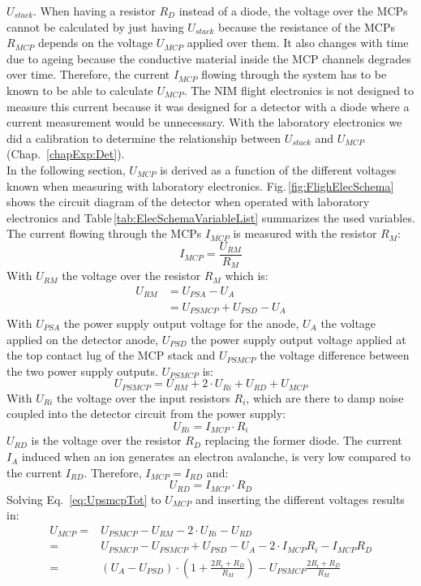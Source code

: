 $U_{stack}$. When having a resistor $R_D$ instead of a diode, the voltage over the MCPs cannot be calculated by just having $U_{stack}$ because the resistance of the MCPs $R_{MCP}$ depends on the voltage $U_{MCP}$ applied over them. It also changes with time due to ageing because the conductive material inside the MCP channels degrades over time. Therefore, the current $I_{MCP}$ flowing through the system has to be known to be able to calculate $U_{MCP}$. The NIM flight electronics is not designed to measure this current because it was designed for a detector with a diode where a current measurement would be unnecessary. With the laboratory electronics we did a calibration to determine the relationship between $U_{stack}$ and $U_{MCP}$ (Chap.~\ref{chapExp:Det}).\\
		In the following section, $U_{MCP}$ is derived as a function of the different voltages known when measuring with laboratory electronics. Fig.\,\ref{fig:FlighElecSchema} shows the circuit diagram of the detector when operated with laboratory electronics and Table\,\ref{tab:ElecSchemaVariableList} summarizes the used variables. The current flowing through the MCPs $I_{MCP}$ is measured with the resistor $R_M$:
		\begin{equation}
			I_{MCP} = \frac{U_{RM}}{R_{M}}
		\end{equation}
		With $U_{RM}$ the voltage over the resistor $R_{M}$ which is:
		\begin{align}
			U_{RM} &= U_{PSA} - U_{A}\\
				   &= U_{PSMCP} + U_{PSD} - U_A
		\end{align}
		With $U_{PSA}$ the power supply output voltage for the anode, $U_{A}$ the voltage applied on the detector anode, $U_{PSD}$ the power supply output voltage applied at the top contact lug of the MCP stack and $U_{PSMCP}$ the voltage difference between the two power supply outputs. $U_{PSMCP}$ is:
		\begin{equation}
			U_{PSMCP} = U_{RM} + 2\cdot U_{Ri} + U_{RD} + U_{MCP}
			\label{eq:UpsmcpTot}
		\end{equation}
		With $U_{Ri}$ the voltage over the input resistors $R_i$, which are there to damp noise coupled into the detector circuit from the power supply:
		\begin{equation}
			U_{Ri} = I_{MCP}\cdot R_i
		\end{equation} 
		$U_{RD}$ is the voltage over the resistor $R_D$ replacing the former diode. The current $I_A$ induced when an ion generates an electron avalanche, is very low compared to the current $I_{RD}$. Therefore, $I_{MCP} = I_{RD}$ and:
		\begin{equation}
			U_{RD} = I_{MCP}\cdot R_D
		\end{equation}
		Solving Eq.~\eqref{eq:UpsmcpTot} to $U_{MCP}$ and inserting the different voltages results in:
		\begin{align}
			U_{MCP} =& U_{PSMCP} - U_{RM} - 2\cdot U_{Ri} - U_{RD}\\
			=& U_{PSMCP} - U_{PSMCP} + U_{PSD} - U_A - 2\cdot I_{MCP} R_i - I_{MCP} R_D\\
			=& (U_A - U_{PSD})\cdot(1 + \frac{2R_i + R_D}{R_M}) - U_{PSMCP}\frac{2R_i + R_D}{R_M}
		\end{align}
		
